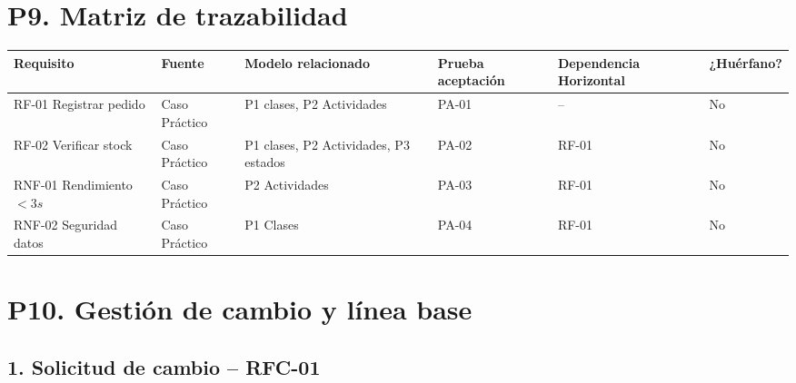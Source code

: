\documentclass[12pt,a4paper]{article}
\begin{document}

\section*{P9. Matriz de trazabilidad}

\begin{table}[H]
\centering
\footnotesize

\begin{tabularx}{\textwidth}{
|>{\raggedright\arraybackslash}p{2.7cm}
|>{\raggedright\arraybackslash}p{1.8cm}
|>{\raggedright\arraybackslash}X
|>{\centering\arraybackslash}p{1.8cm}
|>{\centering\arraybackslash}p{2.1cm}
|>{\centering\arraybackslash}p{1.3cm}|
}
\hline

\textbf{Requisito} &
\textbf{Fuente} &
\textbf{Modelo relacionado} &
\textbf{Prueba aceptación} &
\textbf{Dependencia Horizontal} &
\textbf{¿Huérfano?} \\
\hline

RF-01 Registrar pedido &
Caso Práctico &
P1 clases, P2 Actividades &
PA-01 &
-- &
No \\
\hline

RF-02 Verificar stock &
Caso Práctico &
P1 clases, P2 Actividades, P3 estados &
PA-02 &
RF-01 &
No \\
\hline

RNF-01 Rendimiento $<3s$ &
Caso Práctico &
P2 Actividades &
PA-03 &
RF-01 &
No \\
\hline

RNF-02 Seguridad datos &
Caso Práctico &
P1 Clases &
PA-04 &
RF-01 &
No \\
\hline

\end{tabularx}
\end{table}


\section*{P10. Gestión de cambio y línea base}

\subsection*{1. Solicitud de cambio -- RFC-01}
\end{document}
